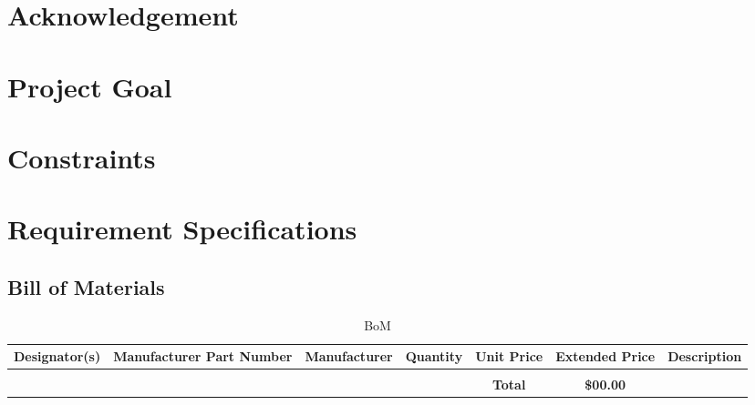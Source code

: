 \documentclass{article}
\begin{document}
\section*{Acknowledgement}
\newpage
\tableofcontents
\newpage
\listoftables
{}
\newpage
\listoffigures
{}
\newpage


\section{Project Goal}
\paragraph{}

\section{Constraints}
\paragraph{}

\section{Requirement Specifications}
\paragraph{}

\begin{landscape}
\thispagestyle{empty}

\section{Bill of Materials}
\begin{table}[h!]
    \centering
    \begin{tabular}{c|c|c|c|c|c|c}
    Designator(s)&Manufacturer Part Number&Manufacturer&Quantity&Unit Price&Extended Price&Description\\
    \hline
    &&&&&&\\
    \hline
    &&&&\textbf{Total}&\textbf{\$00.00}&
    \end{tabular}
    \caption{BoM}
    \label{tab:bom}
\end{table}

\vfill
{\makebox[\linewidth]{\thepage}}
\end{landscape}
\end{document}

